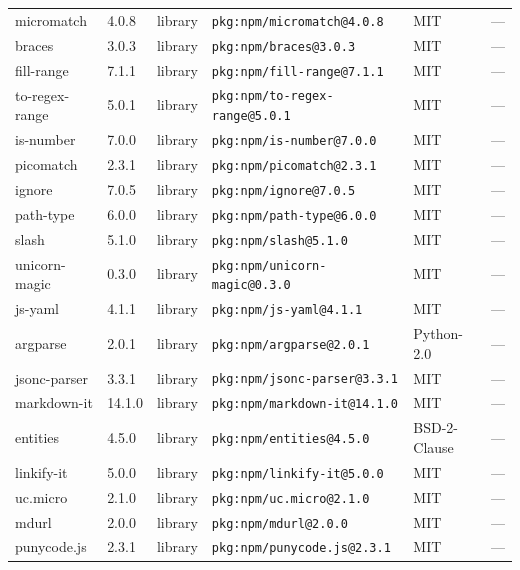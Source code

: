 \documentclass[11pt,a4paper]{article}
\begin{document}
\begin{longtable}{|p{4cm}|p{2cm}|p{1.6cm}|p{5cm}|p{1.5cm}|p{3.5cm}|}
\raggedright micromatch & 4.0.8 & library & \small\texttt{pkg:npm/micromatch@4.0.8} & MIT & \small — \\
\raggedright braces & 3.0.3 & library & \small\texttt{pkg:npm/braces@3.0.3} & MIT & \small — \\
\raggedright fill-range & 7.1.1 & library & \small\texttt{pkg:npm/fill-range@7.1.1} & MIT & \small — \\
\raggedright to-regex-range & 5.0.1 & library & \small\texttt{pkg:npm/to-regex-range@5.0.1} & MIT & \small — \\
\raggedright is-number & 7.0.0 & library & \small\texttt{pkg:npm/is-number@7.0.0} & MIT & \small — \\
\raggedright picomatch & 2.3.1 & library & \small\texttt{pkg:npm/picomatch@2.3.1} & MIT & \small — \\
\raggedright ignore & 7.0.5 & library & \small\texttt{pkg:npm/ignore@7.0.5} & MIT & \small — \\
\raggedright path-type & 6.0.0 & library & \small\texttt{pkg:npm/path-type@6.0.0} & MIT & \small — \\
\raggedright slash & 5.1.0 & library & \small\texttt{pkg:npm/slash@5.1.0} & MIT & \small — \\
\raggedright unicorn-magic & 0.3.0 & library & \small\texttt{pkg:npm/unicorn-magic@0.3.0} & MIT & \small — \\
\raggedright js-yaml & 4.1.1 & library & \small\texttt{pkg:npm/js-yaml@4.1.1} & MIT & \small — \\
\raggedright argparse & 2.0.1 & library & \small\texttt{pkg:npm/argparse@2.0.1} & Python-2.0 & \small — \\
\raggedright jsonc-parser & 3.3.1 & library & \small\texttt{pkg:npm/jsonc-parser@3.3.1} & MIT & \small — \\
\raggedright markdown-it & 14.1.0 & library & \small\texttt{pkg:npm/markdown-it@14.1.0} & MIT & \small — \\
\raggedright entities & 4.5.0 & library & \small\texttt{pkg:npm/entities@4.5.0} & BSD-2-Clause & \small — \\
\raggedright linkify-it & 5.0.0 & library & \small\texttt{pkg:npm/linkify-it@5.0.0} & MIT & \small — \\
\raggedright uc.micro & 2.1.0 & library & \small\texttt{pkg:npm/uc.micro@2.1.0} & MIT & \small — \\
\raggedright mdurl & 2.0.0 & library & \small\texttt{pkg:npm/mdurl@2.0.0} & MIT & \small — \\
\raggedright punycode.js & 2.3.1 & library & \small\texttt{pkg:npm/punycode.js@2.3.1} & MIT & \small — \\

\end{longtable}
\end{document}
